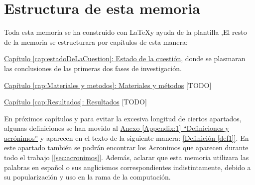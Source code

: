 \section{Estructura de esta memoria}

Toda esta memoria se ha construido con \LaTeX\space [\ref{latexDef}] y ayuda de la plantilla \texis,\space El resto de la memoria se estructurara por capítulos de esta manera:

\hyperref[cap:estadoDeLaCuestion]{Capítulo \ref*{cap:estadoDeLaCuestion}: Estado de la cuestión}, donde se plasmaran las conclusiones de las primeras dos fases de investigación.

\hyperref[cap:Materiales y metodos]{Capítulo \ref*{cap:Materiales y metodos}: Materiales y métodos} [TODO]

\hyperref[cap:Resultados]{Capítulo \ref*{cap:Resultados}: Resultados}  [TODO]

En próximos capítulos y para evitar la excesiva longitud de ciertos apartados, algunas definiciones se han movido al \hyperref[Appendix:1]{Anexo \ref*{Appendix:1} ``Definiciones y acrónimos''} y aparecen en el texto de la siguiente manera:  \hyperref[def1]{[Definición \ref*{def1}]}. En este apartado también se podrán encontrar los Acronimos que aparecen durante todo el trabajo [\ref{sec:acronimos}]. Además, aclarar que esta memoria utilizara las palabras en español o sus anglicismos correspondientes indistintamente, debido a su popularización y uso en la rama de la computación.

